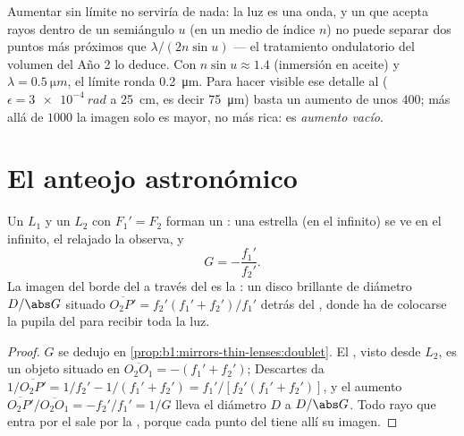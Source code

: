 \begin{remark}\label{rem:b1:optical-instruments:abbe}
Aumentar sin límite no serviría de nada: la luz es una onda, y un 
que acepta rayos dentro de un semiángulo $u$ (en un medio de índice $n$)
no puede separar dos puntos más próximos que
$\lambda/(2n\sin u)$ --- el tratamiento ondulatorio del volumen del Año 2
lo deduce. Con $n\sin u \approx 1.4$ (inmersión en aceite) y $\lambda =
\qty{0.5}{\micro m}$, el límite ronda \qty{0.2}{\micro m}. Para hacer
visible ese detalle al  ($\epsilon = \qty{3e-4}{rad}$ a
\qty{25}{cm}, es decir \qty{75}{\micro m}) basta un aumento de unos $400$;
más allá de $1000$ la imagen solo es mayor, no más rica: es
\emph{aumento vacío}.
\end{remark}

\section{El anteojo astronómico}

\begin{proposition}\label{prop:b1:optical-instruments:telescope}
Un  $L_1$ y un  $L_2$ con $F_1' = F_2$ forman un : una estrella (en el infinito) se ve en el infinito, el 
relajado la observa, y
\[
G = -\frac{f_1'}{f_2'} .
\]
La imagen del borde del  a través del  es la \emph{}: un disco brillante de diámetro $D/\abs G$ situado
$\overline{O_2P'} = f_2'(f_1' + f_2')/f_1'$ detrás del , donde ha de
colocarse la pupila del  para recibir toda la luz.
\end{proposition}

\begin{proof}
$G$ se dedujo en \cref{prop:b1:mirrors-thin-lenses:doublet}. El
, visto desde $L_2$, es un objeto situado en $\overline{O_2O_1} = -(f_1'
+ f_2')$; Descartes da $1/\overline{O_2P'} = 1/f_2' - 1/(f_1' + f_2')
= f_1'/[f_2'(f_1' + f_2')]$, y el aumento $\overline{O_2P'}/
\overline{O_2O_1} = -f_2'/f_1' = 1/G$ lleva el diámetro $D$ a
$D/\abs G$. Todo rayo que entra por el  sale por la , porque cada punto del  tiene allí su imagen.
\end{proof}

